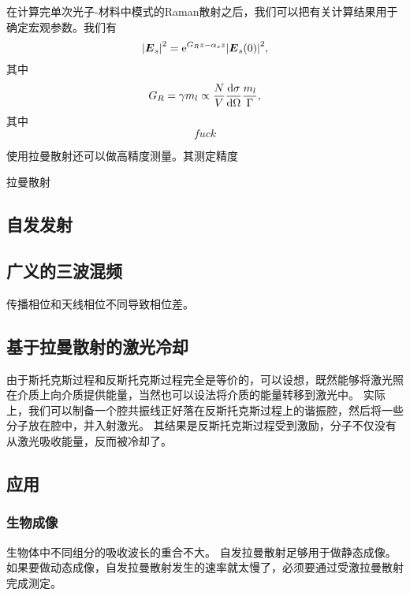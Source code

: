 在计算完单次光子-材料中模式的Raman散射之后，我们可以把有关计算结果用于确定宏观参数。我们有
\begin{equation}
    \abs{\vb*{E}_s}^2 = \mathrm{e}^{G_R z - \alpha_s z} \abs{\vb*{E}_s(0)}^2,
\end{equation}
其中
\begin{equation}
    G_R = \gamma m_l \propto \frac{N}{V} \dv{\sigma}{\Omega} \frac{m_l}{\Gamma},
\end{equation}
其中
\[
    fuck%
\]

使用拉曼散射还可以做高精度测量。其测定精度

拉曼散射

\subsection{自发发射}



\subsection{广义的三波混频}

传播相位和天线相位不同导致相位差。

\subsection{基于拉曼散射的激光冷却}

由于斯托克斯过程和反斯托克斯过程完全是等价的，可以设想，既然能够将激光照在介质上向介质提供能量，当然也可以设法将介质的能量转移到激光中。
实际上，我们可以制备一个腔共振线正好落在反斯托克斯过程上的谐振腔，然后将一些分子放在腔中，并入射激光。
其结果是反斯托克斯过程受到激励，分子不仅没有从激光吸收能量，反而被冷却了。

\subsection{应用}

\subsubsection{生物成像}

生物体中不同组分的吸收波长的重合不大。
自发拉曼散射足够用于做静态成像。如果要做动态成像，自发拉曼散射发生的速率就太慢了，必须要通过受激拉曼散射完成测定。

